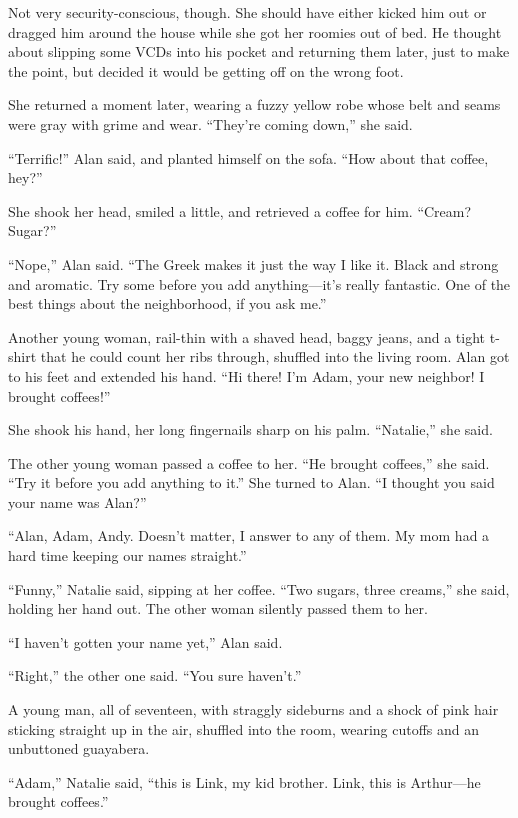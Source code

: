 \documentclass{article}
\begin{document}
Not very security-conscious, though.  She should have either kicked
him out or dragged him around the house while she got her roomies out
of bed.  He thought about slipping some VCDs into his pocket and
returning them later, just to make the point, but decided it would be
getting off on the wrong foot.

She returned a moment later, wearing a fuzzy yellow robe whose belt
and seams were gray with grime and wear.  ``They're coming down,'' she
said.

``Terrific!'' Alan said, and planted himself on the sofa.  ``How about
that coffee, hey?''

She shook her head, smiled a little, and retrieved a coffee for him. 
``Cream?  Sugar?''

``Nope,'' Alan said.  ``The Greek makes it just the way I like it. 
Black and strong and aromatic.  Try some before you add
anything---it's really fantastic.  One of the best things about the
neighborhood, if you ask me.''

Another young woman, rail-thin with a shaved head, baggy jeans, and a
tight t-shirt that he could count her ribs through, shuffled into the
living room.  Alan got to his feet and extended his hand.  ``Hi there! 
I'm Adam, your new neighbor!  I brought coffees!''

She shook his hand, her long fingernails sharp on his palm. 
``Natalie,'' she said.

The other young woman passed a coffee to her.  ``He brought coffees,''
she said.  ``Try it before you add anything to it.'' She turned to
Alan.  ``I thought you said your name was Alan?''

``Alan, Adam, Andy.  Doesn't matter, I answer to any of them.  My mom
had a hard time keeping our names straight.''

``Funny,'' Natalie said, sipping at her coffee.  ``Two sugars, three
creams,'' she said, holding her hand out.  The other woman silently
passed them to her.

``I haven't gotten your name yet,'' Alan said.

``Right,'' the other one said.  ``You sure haven't.''

A young man, all of seventeen, with straggly sideburns and a shock of
pink hair sticking straight up in the air, shuffled into the room,
wearing cutoffs and an unbuttoned guayabera.

``Adam,'' Natalie said, ``this is Link, my kid brother.  Link, this is
Arthur---he brought coffees.''
\end{document}
